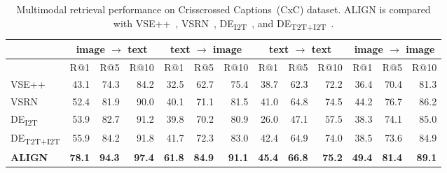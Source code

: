 \documentclass{article}
\begin{document}
\begin{table}[t]
\begin{center}
\caption{Multimodal retrieval performance on Crisscrossed Captions~(CxC) dataset. ALIGN is compared with VSE++~\cite{faghri:vse++}, VSRN~\cite{li:vsrn}, DE\textsubscript{I2T}~\cite{parekh:cxc}, and DE\textsubscript{T2T+I2T}~\cite{parekh:cxc}.}
\label{tab:cxc_results}
\vspace{2mm}
\begin{small}
\begin{tabular}{l|rrr|rrr|rrr|rrr}
\toprule
& \multicolumn{3}{c|}{image $\to$ text} & \multicolumn{3}{c|}{text $\to$ image} & \multicolumn{3}{c|}{text $\to$ text} & \multicolumn{3}{c}{image $\to$ image} \\
\midrule
& R@1 & R@5 & R@10 & R@1 & R@5 & R@10 & R@1 & R@5 & R@10 & R@1 & R@5 & R@10 \\
VSE++                     & 43.1 & 74.3 & 84.2 & 32.5 & 62.7 & 75.4 & 38.7 & 62.3 & 72.2 & 36.4 & 70.4 & 81.3 \\
VSRN                      & 52.4 & 81.9 & 90.0 & 40.1 & 71.1 & 81.5 & 41.0 & 64.8 & 74.5 & 44.2 & 76.7 & 86.2 \\ 
DE\textsubscript{I2T}     & 53.9 & 82.7 & 91.2 & 39.8 & 70.2 & 80.9 & 26.0 & 47.1 & 57.5 & 38.3 & 74.1 & 85.0 \\
DE\textsubscript{T2T+I2T} & 55.9 & 84.2 & 91.8 & 41.7 & 72.3 & 83.0 & 42.4 & 64.9 & 74.0 & 38.5 & 73.6 & 84.9 \\
\textbf{ALIGN}            & \textbf{78.1} & \textbf{94.3} & \textbf{97.4} & \textbf{61.8} & \textbf{84.9} & \textbf{91.1} & \textbf{45.4} & \textbf{66.8} & \textbf{75.2} & \textbf{49.4} & \textbf{81.4} & \textbf{89.1} \\
\bottomrule
\end{tabular}
\end{small}
\end{center}
\vspace{-5mm}
\end{table}
\end{document}
